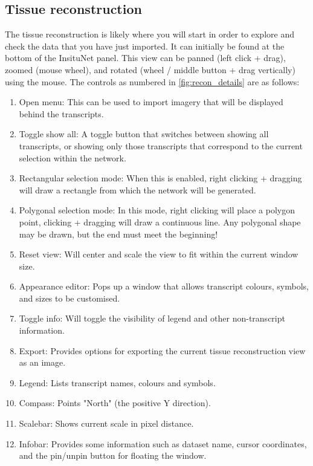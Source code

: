 \documentclass[a4paper,12pt]{article}
\begin{document}
\subsection{Tissue reconstruction}
The tissue reconstruction is likely where you will start in order to explore and check the data that you have just imported. It can initially be found at the bottom of the InsituNet panel. This view can be panned (left click + drag), zoomed (mouse wheel), and rotated (wheel / middle button + drag vertically) using the mouse. The controls as numbered in \ref{fig:recon_details} are as follows:

\begin{enumerate}
	\item Open menu: This can be used to import imagery that will be displayed behind the transcripts.
	\item Toggle show all: A toggle button that switches between showing all transcripts, or showing only those transcripts that correspond to the current selection within the network.
	\item Rectangular selection mode: When this is enabled, right clicking + dragging will draw a rectangle from which the network will be generated.
	\item Polygonal selection mode: In this mode, right clicking will place a polygon point, clicking + dragging will draw a continuous line. Any polygonal shape may be drawn, but the end must meet the beginning!
	\item Reset view: Will center and scale the view to fit within the current window size.
	\item Appearance editor: Pops up a window that allows transcript colours, symbols, and sizes to be customised.
	\item Toggle info: Will toggle the visibility of legend and other non-transcript information.
	\item Export: Provides options for exporting the current tissue reconstruction view as an image.
	\item Legend: Lists transcript names, colours and symbols.
	\item Compass: Points "North" (the positive Y direction).
	\item Scalebar: Shows current scale in pixel distance.
	\item Infobar: Provides some information such as dataset name, cursor coordinates, and the pin/unpin button for floating the window.
\end{enumerate}
\end{document}

